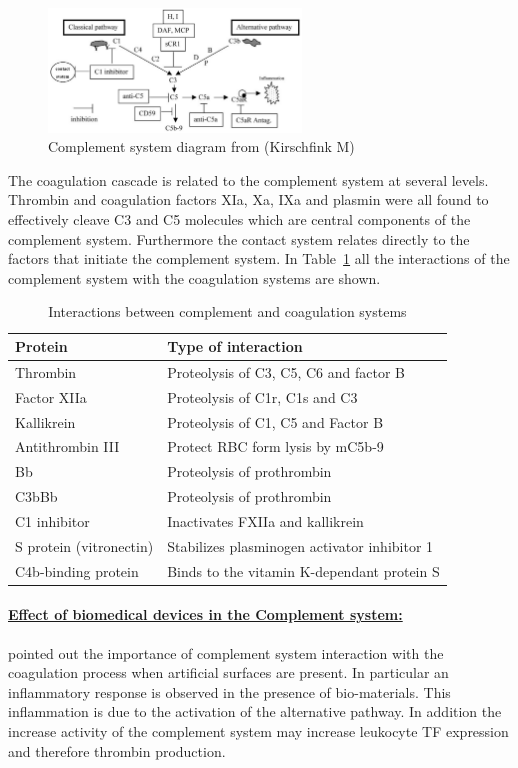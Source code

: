\documentclass[%
 nofootinbib,
 amsmath,amssymb,
 aps,
 pra,
]{revtex4-1}
\begin{document}
\begin{figure}[h]
\includegraphics[width=0.6\textwidth]{Figures/contactsystem.png}
\caption{\label{diag:complement} Complement system diagram from \cite{Gorbet:2004} (Kirschfink M)}
\end{figure}
The coagulation cascade is related to the complement system at several levels. Thrombin and coagulation factors XIa, Xa, IXa and plasmin were all found to effectively cleave C3 and C5 molecules which are central components of the complement system. Furthermore the contact system relates directly to the factors that initiate the complement system.  In Table~\ref{tab:comple} all the interactions of the complement system with the coagulation systems are shown.\\
\begin{table}[h]
\begin{tabular}{l l}
\hline
Protein & Type of interaction \\
\hline
Thrombin & Proteolysis of C3, C5, C6 and factor B\\
Factor XIIa & Proteolysis of C1r, C1s and C3\\
Kallikrein & Proteolysis of C1, C5 and Factor B \\
Antithrombin III & Protect RBC form lysis by mC5b-9\\
Bb & Proteolysis of prothrombin \\
C3bBb & Proteolysis of prothrombin \\
C1 inhibitor & Inactivates FXIIa and kallikrein \\
S protein (vitronectin) & Stabilizes plasminogen activator inhibitor 1 \\
C4b-binding protein & Binds to the vitamin K-dependant protein S \\
\hline
\end{tabular}
\caption{\label{tab:comple}Interactions between complement and coagulation systems \cite{Gorbet:2004}}
\end{table}
\paragraph{\underline{Effect of biomedical devices in the Complement system:}}
\citet{Gorbet:2004} pointed out the importance of complement system interaction with the coagulation process when artificial surfaces are present. In particular an inflammatory response is observed in the presence of bio-materials. This inflammation is due to the activation of the alternative pathway. In addition the increase activity of the complement system may increase leukocyte TF expression and therefore thrombin production.
\end{document}
